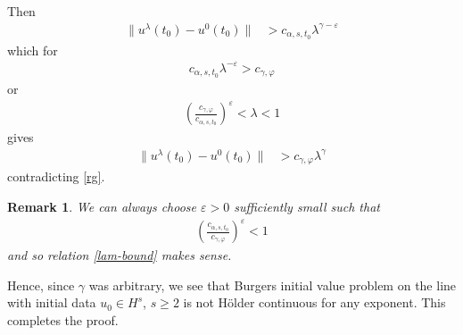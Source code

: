 \documentclass[12pt,reqno]{amsart}
\numberwithin{equation}{section}  %
\numberwithin{figure}{section}
\newcommand{\ee}{\varepsilon}
\newcommand{\vp}{\varphi}
\newtheorem{remark}[theorem]{Remark}
\begin{document}
Then
\begin{equation*}
\begin{split}
  \| u^{\lambda}(t_{0}) - u^{0}(t_{0}) \| 
  &  > c_{\alpha,s, t_{0}} \lambda^{\gamma - \ee}
\end{split}
\end{equation*}
%
which for 
%
%
\begin{equation*}
\begin{split}
  c_{\alpha,s, t_{0}}\lambda^{-\ee} > c_{\gamma, \vp}
\end{split}
\end{equation*}
%
%
or 
%
%
\begin{equation}
  \label{lam-bound}
\begin{split}
    \left (\frac{c_{\gamma, \vp}}{c_{\alpha, s, t_{0}}} \right)^{\ee} < \lambda < 1
\end{split}
\end{equation}
%
%
gives
%
%
\begin{equation*}
\begin{split}
  \| u^{\lambda}(t_{0}) - u^{0}(t_{0}) \| 
  &  > c_{\gamma, \vp} \lambda^{\gamma}
\end{split}
\end{equation*}
%
contradicting \eqref{rg}.
%
\begin{framed}
  \begin{remark}
  We can always choose $\ee > 0$ sufficiently small such that
\begin{equation*}
\begin{split}
    \left (\frac{c_{\alpha, s, t_{0}}}{c_{\gamma, \vp}}
\right )^{\ee} < 1
\end{split}
\end{equation*}
and so relation \eqref{lam-bound} makes sense.
\end{remark}
\end{framed}
Hence, since $\gamma$ was arbitrary, we see that Burgers
initial value problem on the line with initial data $u_{0} \in H^{s}$, $s \ge 2$
is not H\"older continuous for any exponent. This completes the proof.
%
%
\end{document}
